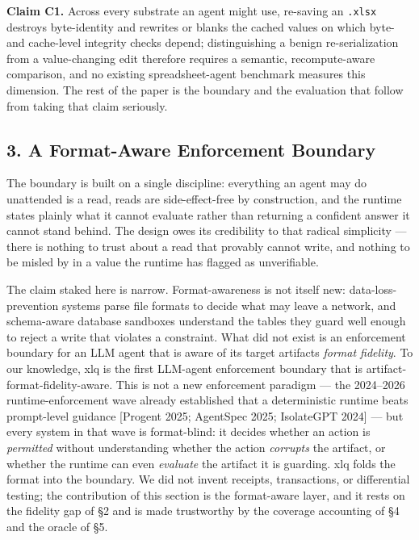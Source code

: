 \documentclass[
]{article}
\begin{document}
\textbf{Claim C1.} Across every substrate an agent might use, re-saving
an \texttt{.xlsx} destroys byte-identity and rewrites or blanks the
cached values on which byte- and cache-level integrity checks depend;
distinguishing a benign re-serialization from a value-changing edit
therefore requires a semantic, recompute-aware comparison, and no
existing spreadsheet-agent benchmark measures this dimension. The rest
of the paper is the boundary and the evaluation that follow from taking
that claim seriously.

\subsection{3. A Format-Aware Enforcement
Boundary}\label{3-a-format-aware-enforcement-boundary}

The boundary is built on a single discipline: everything an agent may do
unattended is a read, reads are side-effect-free by construction, and
the runtime states plainly what it cannot evaluate rather than returning
a confident answer it cannot stand behind. The design owes its
credibility to that radical simplicity --- there is nothing to trust
about a read that provably cannot write, and nothing to be misled by in
a value the runtime has flagged as unverifiable.

The claim staked here is narrow. Format-awareness is not itself new:
data-loss-prevention systems parse file formats to decide what may leave
a network, and schema-aware database sandboxes understand the tables
they guard well enough to reject a write that violates a constraint.
What did not exist is an enforcement boundary for an LLM agent that is
aware of its target artifact\textquotesingle s \emph{format fidelity}.
To our knowledge, xlq is the first LLM-agent enforcement boundary that
is artifact-format-fidelity-aware. This is not a new enforcement
paradigm --- the 2024--2026 runtime-enforcement wave already established
that a deterministic runtime beats prompt-level guidance {[}Progent
2025; AgentSpec 2025; IsolateGPT 2024{]} --- but every system in that
wave is format-blind: it decides whether an action is \emph{permitted}
without understanding whether the action \emph{corrupts} the artifact,
or whether the runtime can even \emph{evaluate} the artifact it is
guarding. xlq folds the format into the boundary. We did not invent
receipts, transactions, or differential testing; the contribution of
this section is the format-aware layer, and it rests on the fidelity gap
of §2 and is made trustworthy by the coverage accounting of §4 and the
oracle of §5.
\end{document}
